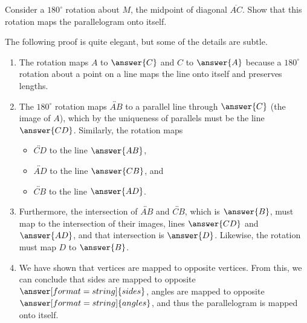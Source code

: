 \documentclass[nooutcomes]{ximera}
\begin{document}
\begin{problem}
Consider a $180^\circ$ rotation about $M$, the midpoint of diagonal $\overline{AC}$.  Show that this rotation maps the parallelogram onto itself.  
\begin{warning}
The following proof is quite elegant, but some of the details are subtle.
\end{warning}
\begin{enumerate}
\item The rotation maps $A$ to $\answer{C}$ and $C$ to $\answer{A}$ because a $180^\circ$ rotation about a point on a line maps the line onto itself and preserves lengths.
\item The $180^\circ$ rotation maps $\overleftrightarrow{AB}$ to a parallel line through $\answer{C}$ (the image of $A$), which by the uniqueness of parallels must 
be the line $\answer{CD}$.  Similarly, the rotation maps 
\begin{itemize}
\item $\overleftrightarrow{CD}$ to the line $\answer{AB}$, 
\item $\overleftrightarrow{AD}$ to the line $\answer{CB}$, and
\item $\overleftrightarrow{CB}$ to the line $\answer{AD}$.
\end{itemize}

\item Furthermore, the intersection of $\overleftrightarrow{AB}$ and $\overleftrightarrow{CB}$, which is $\answer{B}$, must map to the intersection of their images, lines 
$\answer{CD}$ and $\answer{AD}$, and that intersection is $\answer{D}$.  Likewise, the rotation must map $D$ to $\answer{B}$.

\item We have shown that vertices are mapped to opposite vertices.  From this, we can conclude that sides are mapped to opposite $\answer[format=string]{sides}$, angles are mapped to 
opposite $\answer[format=string]{angles}$, and thus the parallelogram is mapped onto itself.  
\end{enumerate}


\end{problem}
\end{document}
